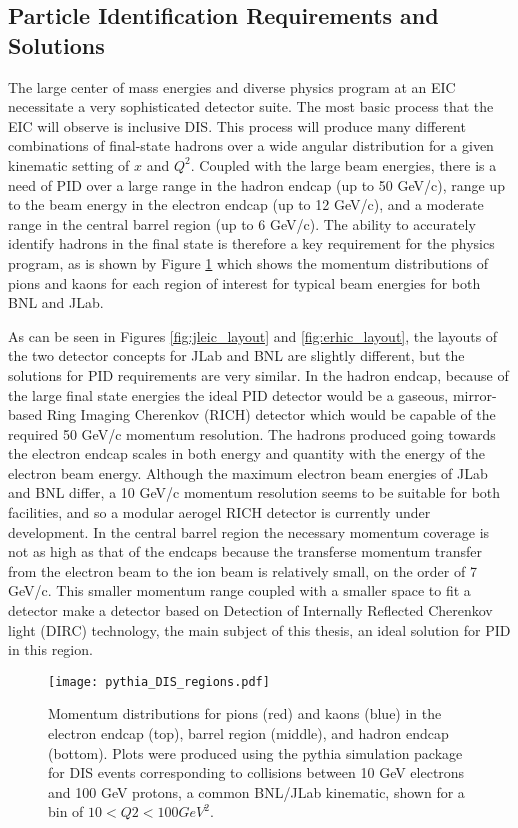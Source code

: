 \subsection{Particle Identification Requirements and Solutions}
The large center of mass energies and diverse physics program at an EIC necessitate a very sophisticated detector suite. The most basic process that the EIC will observe is inclusive DIS. This process will produce many different combinations of final-state hadrons over a wide angular distribution for a given kinematic setting of $x$ and $Q^2$. Coupled with the large beam energies, there is a need of PID over a large range in the hadron endcap (up to 50 GeV/c), range up to the beam energy in the electron endcap (up to 12 GeV/c), and a moderate range in the central barrel region (up to 6 GeV/c). The ability to accurately identify hadrons in the final state is therefore a key requirement for the physics program, as is shown by Figure \ref{fig:pythia_DIS} which shows the momentum distributions of pions and kaons for each region of interest for typical beam energies for both BNL and JLab.

As can be seen in Figures \ref{fig:jleic_layout} and \ref{fig:erhic_layout}, the layouts of the two detector concepts for JLab and BNL are slightly different, but the solutions for PID requirements are very similar. In the hadron endcap, because of the large final state energies the ideal PID detector would be a gaseous, mirror-based Ring Imaging Cherenkov (RICH) detector which would be capable of the required 50 GeV/c momentum resolution. The hadrons produced going towards the electron endcap scales in both energy and quantity with the energy of the electron beam energy. Although the maximum electron beam energies of JLab and BNL differ, a 10 GeV/c momentum resolution seems to be suitable for both facilities, and so a modular aerogel RICH detector is currently under development. In the central barrel region the necessary momentum coverage is not as high as that of the endcaps because the transferse momentum transfer from the electron beam to the ion beam is relatively small, on the order of 7 GeV/c. This smaller momentum range coupled with a smaller space to fit a detector make a detector based on Detection of Internally Reflected Cherenkov light (DIRC) technology, the main subject of this thesis, an ideal solution for PID in this region.


\begin{figure}[!htb]
	\centering
	\texttt{[image: pythia\_DIS\_regions.pdf]}
	\caption{Momentum distributions for pions (red) and kaons (blue) in the electron endcap (top), barrel region (middle), and hadron endcap (bottom). Plots were produced using the pythia simulation package for DIS events corresponding to collisions between 10 GeV electrons and 100 GeV protons, a common BNL/JLab kinematic, shown for a bin of $10<Q2<100\unit{GeV}^2$.}
	\label{fig:pythia_DIS}
\end{figure}


